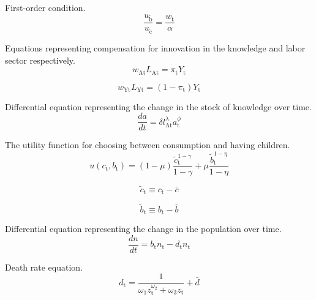 \documentclass[letterpaper,12pt]{article}
\begin{document}
First-order condition.
\begin{equation} \label{eq:first_order_condition}
	\frac{u_\mathrm{\tilde b}}{u_\mathrm{\tilde c}} = \frac{w_\mathrm{t}}{\alpha}
\end{equation}

Equations representing compensation for innovation in the knowledge and labor sector respectively.
\begin{equation} \label{eq:knowledge_comp}
	w_\mathrm{At} L_\mathrm{At} = \pi_\mathrm{t} Y_\mathrm{t}
\end{equation}

\begin{equation} \label{labor_comp}
	w_\mathrm{Yt} L_\mathrm{Yt} = (1-\pi_\mathrm{t})Y_\mathrm{t}
\end{equation}

Differential equation representing the change in the stock of knowledge over time.
\begin{equation} \label{eq:da_dt}
	\frac{da}{dt} = \delta l_\mathrm{At}^\lambda a_\mathrm{t}^\phi
\end{equation}

The utility function for choosing between consumption and having children.
\begin{equation} \label{eq:utility}
	u(c_\mathrm{t}, b_\mathrm{t}) = (1-\mu) \frac{\tilde c_\mathrm{t}^{1-\gamma}}{1-\gamma} + \mu \frac{\tilde b_\mathrm{t}^{1-\eta}}{1-\eta}
\end{equation}

\begin{equation} \label{eq:c_tilde}
	\tilde c_\mathrm{t} \equiv c_\mathrm{t} - \bar c
\end{equation}

\begin{equation} \label{eq:b_tilde}
	\tilde b_\mathrm{t} \equiv b_\mathrm{t} - \bar b
\end{equation}

Differential equation representing the change in the population over time.
\begin{equation} \label{dn_dt}
	\frac{dn}{dt} = b_\mathrm{t} n_\mathrm{t} - d_\mathrm{t} n_\mathrm{t}
\end{equation}

Death rate equation.
\begin{equation} \label{deathrate}
	d_\mathrm{t} = \frac{1}{\omega_\mathrm{1} z_\mathrm{t}^{\omega_\mathrm{2}} + \omega_\mathrm{3} z_\mathrm{t}} + \bar d
\end{equation}
\end{document}
